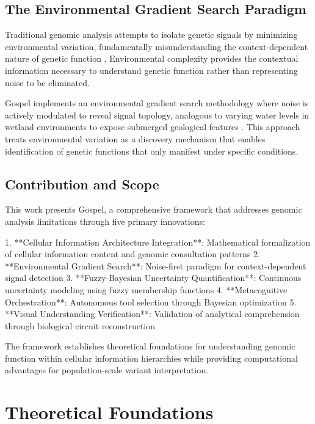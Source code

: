 \documentclass[12pt,a4paper]{article}
\begin{document}
\subsection{The Environmental Gradient Search Paradigm}

Traditional genomic analysis attempts to isolate genetic signals by minimizing environmental variation, fundamentally misunderstanding the context-dependent nature of genetic function \cite{fiehn2002metabolomics, patti2012innovation}. Environmental complexity provides the contextual information necessary to understand genetic function rather than representing noise to be eliminated.

Gospel implements an environmental gradient search methodology where noise is actively modulated to reveal signal topology, analogous to varying water levels in wetland environments to expose submerged geological features \cite{wishart2018hmdb, smith2006xcms}. This approach treats environmental variation as a discovery mechanism that enables identification of genetic functions that only manifest under specific conditions.

\subsection{Contribution and Scope}

This work presents Gospel, a comprehensive framework that addresses genomic analysis limitations through five primary innovations:

1. **Cellular Information Architecture Integration**: Mathematical formalization of cellular information content and genomic consultation patterns
2. **Environmental Gradient Search**: Noise-first paradigm for context-dependent signal detection
3. **Fuzzy-Bayesian Uncertainty Quantification**: Continuous uncertainty modeling using fuzzy membership functions
4. **Metacognitive Orchestration**: Autonomous tool selection through Bayesian optimization
5. **Visual Understanding Verification**: Validation of analytical comprehension through biological circuit reconstruction

The framework establishes theoretical foundations for understanding genomic function within cellular information hierarchies while providing computational advantages for population-scale variant interpretation.

\section{Theoretical Foundations}
\end{document}
